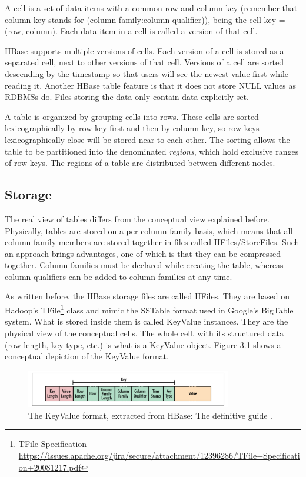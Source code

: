 A cell is a set of data items with a common row and column key (remember that column key stands for (column family:column qualifier)), being the cell key = (row, column). Each data item in a cell is called a version of that cell.
\par
HBase supports multiple versions of cells. Each version of a cell is stored as a separated cell, next to other versions of that cell. Versions of a cell are sorted descending by the timestamp so that users will see the newest value first while reading it.
Another HBase table feature is that it does not store NULL values as RDBMSs do. Files storing the data only contain data explicitly set.
\par
A table is organized by grouping cells into rows. These cells are sorted lexicographically by row key first and then by column key, so row keys lexicographically close will be stored near to each other. The sorting allows the table to be partitioned into the denominated \textit{regions}, which hold exclusive ranges of row keys. The regions of a table are distributed between different nodes.

\subsection {Storage}

The real view of tables differs from the conceptual view explained before. Physically, tables are stored on a per-column family basis, which means that all column family members are stored together in files called HFiles/StoreFiles. Such an approach brings advantages, one of which is that they can be compressed together. Column families must be declared while creating the table, whereas column qualifiers can be added to column families at any time.
\par
As written before, the HBase storage files are called HFiles. They are based on Hadoop's TFile\footnote{{TF}ile {S}pecification - \url{https://issues.apache.org/jira/secure/attachment/12396286/TFile+Specification+20081217.pdf}} class and mimic the SSTable format used in Google's BigTable system. What is stored inside them is called KeyValue instances. They are the physical view of the conceptual cells. The whole cell, with its structured data (row length, key type, etc.) is what is a KeyValue object. Figure 3.1 shows a conceptual depiction of the KeyValue format.
\par

\begin{figure}[htb]
\centering
\includegraphics[width=0.8\textwidth]{./images/keyvalue.png}
\caption{The KeyValue format, extracted from HBase: The definitive guide \cite{george2011hbase}.} \label{fig:keyvalue}
\end{figure}


